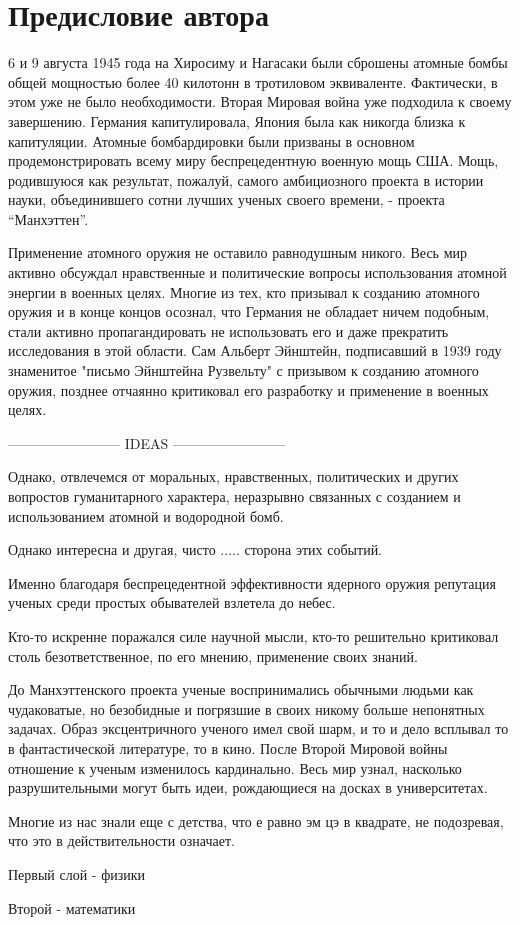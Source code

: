 \chapter*{Предисловие автора}

6 и 9 августа 1945 года на Хиросиму и Нагасаки были сброшены атомные бомбы общей мощностью более 40 килотонн в тротиловом эквиваленте.
Фактически, в этом уже не было необходимости. 
Вторая Мировая война уже подходила к своему завершению. 
Германия капитулировала, Япония была как никогда близка к капитуляции.
Атомные бомбардировки были призваны в основном продемонстрировать всему миру беспрецедентную военную мощь США. 
Мощь, родившуюся как результат, пожалуй, самого амбициозного проекта в истории науки, объединившего сотни лучших ученых своего времени, - проекта ``Манхэттен''.

Применение атомного оружия не оставило равнодушным никого.
Весь мир активно обсуждал нравственные и политические вопросы использования атомной энергии в военных целях.
Многие из тех, кто призывал к созданию атомного оружия и в конце концов осознал, что Германия не обладает ничем подобным, стали активно пропагандировать не использовать его и даже прекратить исследования в этой области. 
Сам Альберт Эйнштейн, подписавший в 1939 году знаменитое "письмо Эйнштейна Рузвельту" с призывом к созданию атомного оружия, позднее отчаянно критиковал его разработку и применение в военных целях.

------------------------ IDEAS ------------------------ 

Однако, отвлечемся от моральных, нравственных, политических и других вопростов гуманитарного характера, неразрывно связанных с созданием и использованием атомной и водородной бомб. 






Однако интересна и другая, чисто ..... сторона этих событий. 

Именно благодаря беспрецедентной эффективности ядерного оружия репутация ученых среди простых обывателей взлетела до небес. 


Кто-то искренне поражался силе научной мысли, кто-то решительно критиковал столь безответственное, по его мнению, применение своих знаний.

До Манхэттенского проекта ученые воспринимались обычными людьми как чудаковатые, но безобидные и погрязшие в своих никому больше непонятных задачах. 
Образ эксцентричного ученого имел свой шарм, и то и дело всплывал то в фантастической литературе, то в кино.
После Второй Мировой войны отношение к ученым изменилось кардинально.
Весь мир узнал, насколько разрушительными могут быть идеи, рождающиеся на досках в университетах.


Многие из нас знали еще с детства, что е равно эм цэ в квадрате, не подозревая, что это в действительности означает.

Первый слой - физики

Второй - математики


